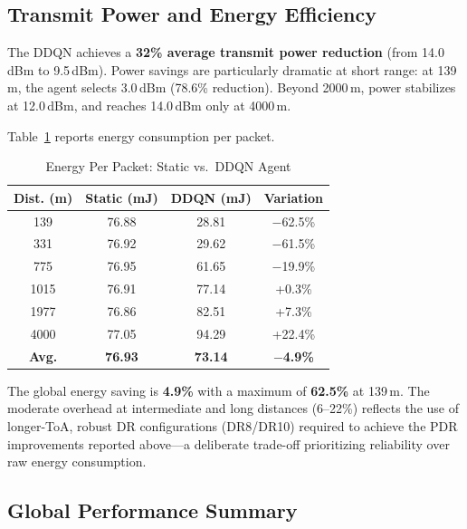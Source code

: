 \documentclass[conference]{IEEEtran}
\begin{document}
	\subsection{Transmit Power and Energy Efficiency}
	
	The DDQN achieves a \textbf{32\% average transmit power reduction} (from
	14.0\,dBm to 9.5\,dBm). Power savings are particularly dramatic at short
	range: at 139\,m, the agent selects 3.0\,dBm (78.6\% reduction). Beyond
	2000\,m, power stabilizes at 12.0\,dBm, and reaches 14.0\,dBm only at 4000\,m.
	
	Table~\ref{tab:energy} reports energy consumption per packet.
	
	\begin{table}[!t]
		\centering
		\caption{Energy Per Packet: Static vs.\ DDQN Agent}
		\label{tab:energy}
		\begin{tabular}{|c|c|c|c|}
			\hline
			\textbf{Dist. (m)} & \textbf{Static (mJ)} & \textbf{DDQN (mJ)} & \textbf{Variation} \\
			\hline
			139  & 76.88 & 28.81 & \cellcolor{green!20}$-$62.5\% \\
			331  & 76.92 & 29.62 & \cellcolor{green!20}$-$61.5\% \\
			775  & 76.95 & 61.65 & \cellcolor{green!20}$-$19.9\% \\
			1015 & 76.91 & 77.14 & \cellcolor{red!20}+0.3\% \\
			1977 & 76.86 & 82.51 & \cellcolor{red!20}+7.3\% \\
			4000 & 77.05 & 94.29 & \cellcolor{red!20}+22.4\% \\
			\hline
			\textbf{Avg.} & \textbf{76.93} & \textbf{73.14} & \cellcolor{green!20}\textbf{$-$4.9\%} \\
			\hline
		\end{tabular}
	\end{table}
	
	The global energy saving is \textbf{4.9\%} with a maximum of \textbf{62.5\%}
	at 139\,m. The moderate overhead at intermediate and long distances (6--22\%)
	reflects the use of longer-ToA, robust DR configurations (DR8/DR10) required
	to achieve the PDR improvements reported above---a deliberate trade-off
	prioritizing reliability over raw energy consumption.
	
	\subsection{Global Performance Summary}
	
\end{document}
